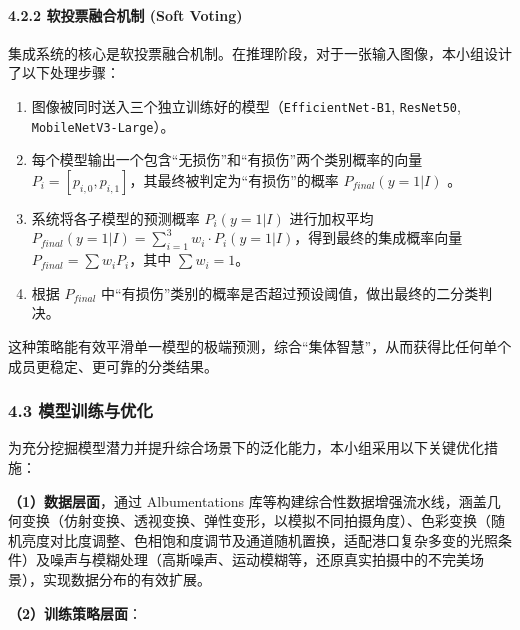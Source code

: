 \documentclass[
]{article}
\begin{document}
\paragraph{\texorpdfstring{\textbf{4.2.2 软投票融合机制 (Soft
Voting)}}{4.2.2 软投票融合机制 (Soft Voting)}}\label{422-ux8f6fux6295ux7968ux878dux5408ux673aux5236-soft-voting}

集成系统的核心是软投票融合机制。在推理阶段，对于一张输入图像，本小组设计了以下处理步骤：

\begin{enumerate}
\def\labelenumi{\arabic{enumi}.}
\item
  图像被同时送入三个独立训练好的模型（\texttt{EfficientNet-B1},
  \texttt{ResNet50}, \texttt{MobileNetV3-Large}）。
\item
  每个模型输出一个包含``无损伤''和``有损伤''两个类别概率的向量\(P_i = [p_{i,0}, p_{i,1}]\)，其最终被判定为``有损伤''的概率
  \(P_{final}(y=1|I)\) 。
\item
  系统将各子模型的预测概率 \(P_i(y=1|I)\)
  进行加权平均\(P_{final}(y=1|I) = \sum_{i=1}^{3} w_i \cdot P_i(y=1|I)\)，得到最终的集成概率向量
  \(P_{final} = \sum w_i P_i\)，其中 \(\sum w_i = 1\)。
\item
  根据 \(P_{final}\)
  中``有损伤''类别的概率是否超过预设阈值，做出最终的二分类判决。
\end{enumerate}

这种策略能有效平滑单一模型的极端预测，综合``集体智慧''，从而获得比任何单个成员更稳定、更可靠的分类结果。

\subsubsection{\texorpdfstring{\textbf{4.3
模型训练与优化}}{4.3 模型训练与优化}}\label{43-ux6a21ux578bux8badux7ec3ux4e0eux4f18ux5316}

为充分挖掘模型潜力并提升综合场景下的泛化能力，本小组采用以下关键优化措施：

\textbf{（1）数据层面}，通过 Albumentations
库等构建综合性数据增强流水线，涵盖几何变换（仿射变换、透视变换、弹性变形，以模拟不同拍摄角度）、色彩变换（随机亮度对比度调整、色相饱和度调节及通道随机置换，适配港口复杂多变的光照条件）及噪声与模糊处理（高斯噪声、运动模糊等，还原真实拍摄中的不完美场景），实现数据分布的有效扩展。

\textbf{（2）训练策略层面}：
\end{document}
